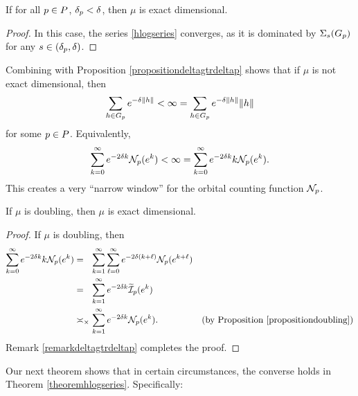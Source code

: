 \begin{corollary}
\label{corollarydeltagtrdeltap}
If for all $p\in P$, $\delta_p < \delta$, then $\mu$ is exact dimensional.
\end{corollary}
\begin{proof}
In this case, the series \eqref{hlogseries} converges, as it is dominated by $\Sigma_s(G_p)$ for any $s\in (\delta_p,\delta)$.
\end{proof}

\begin{remark}
\label{remarkdeltagtrdeltap}
Combining with Proposition \ref{propositiondeltagtrdeltap} shows that if $\mu$ is not exact dimensional, then
\[
\sum_{h\in G_p} e^{-\delta\|h\|} < \infty = \sum_{h\in G_p} e^{-\delta\|h\|} \|h\|
\]
for some $p\in P$. Equivalently,
\[
\sum_{k = 0}^\infty e^{-2\delta k} \mathcal N_p(e^k) < \infty = \sum_{k = 0}^\infty e^{-2\delta k} k \mathcal N_p(e^k).
\]
This creates a very ``narrow window'' for the orbital counting function $\mathcal N_p$.
\end{remark}

\begin{corollary}
\label{corollarydoublingexactdim}
If $\mu$ is doubling, then $\mu$ is exact dimensional.
\end{corollary}
\begin{proof}
If $\mu$ is doubling, then
\begin{align*}
\sum_{k = 0}^\infty e^{-2\delta k} k \NN_\bp(e^k)
&=_\pt \sum_{k = 1}^\infty \sum_{\ell = 0}^\infty e^{-2\delta (k + \ell)} \NN_\bp(e^{k + \ell})\\
&=_\pt \sum_{k = 1}^\infty e^{-2\delta k} \w\II_\bp(e^k)\\
&\asymp_\times \sum_{k = 1}^\infty e^{-2\delta k} \NN_\bp(e^k). \by{Proposition \ref{propositiondoubling}}
\end{align*}
Remark \ref{remarkdeltagtrdeltap} completes the proof.
\end{proof}


Our next theorem shows that in certain circumstances, the converse holds in Theorem \ref{theoremhlogseries}. Specifically:

